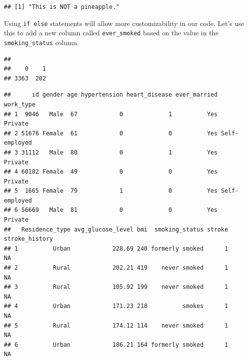\documentclass[
]{book}
\newenvironment{Shaded}{\begin{snugshade}}{\end{snugshade}}
\newcommand{\ConstantTok}[1]{\textcolor[rgb]{0.56,0.35,0.01}{#1}}
\newcommand{\FunctionTok}[1]{\textcolor[rgb]{0.13,0.29,0.53}{\textbf{#1}}}
\newcommand{\NormalTok}[1]{#1}
\newcommand{\OtherTok}[1]{\textcolor[rgb]{0.56,0.35,0.01}{#1}}
\newcommand{\SpecialCharTok}[1]{\textcolor[rgb]{0.81,0.36,0.00}{\textbf{#1}}}
\begin{document}
\begin{verbatim}
## [1] "This is NOT a pineapple."
\end{verbatim}

Using \texttt{if\ else} statements will allow more customizability in our code. Let's use this to add a new column called \texttt{ever\_smoked} based on the value in the \texttt{smoking\_status} column.

\begin{Shaded}
\end{Shaded}

\begin{verbatim}
## 
##    0    1 
## 3363  202
\end{verbatim}

\begin{Shaded}
\end{Shaded}

\begin{verbatim}
##      id gender age hypertension heart_disease ever_married     work_type
## 1  9046   Male  67            0             1          Yes       Private
## 2 51676 Female  61            0             0          Yes Self-employed
## 3 31112   Male  80            0             1          Yes       Private
## 4 60182 Female  49            0             0          Yes       Private
## 5  1665 Female  79            1             0          Yes Self-employed
## 6 56669   Male  81            0             0          Yes       Private
##   Residence_type avg_glucose_level bmi  smoking_status stroke stroke_history
## 1          Urban            228.69 240 formerly smoked      1             NA
## 2          Rural            202.21 419    never smoked      1             NA
## 3          Rural            105.92 199    never smoked      1             NA
## 4          Urban            171.23 218          smokes      1             NA
## 5          Rural            174.12 114    never smoked      1             NA
## 6          Urban            186.21 164 formerly smoked      1             NA
\end{verbatim}
\end{document}
